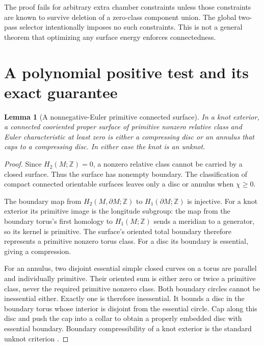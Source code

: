 \documentclass[11pt,letterpaper]{article}
\newtheorem{lemma}[theorem]{Lemma}
\theoremstyle{definition}
\newcommand{\Z}{\mathbb Z}
\begin{document}
The proof fails for arbitrary extra chamber constraints unless those constraints are known to survive deletion of a zero-class component union. The global two-pass selector intentionally imposes no such constraints. This is not a general theorem that optimizing any surface energy enforces connectedness.

\section{A polynomial positive test and its exact guarantee}\label{sec:positive}

\begin{lemma}[A nonnegative-Euler primitive connected surface]\label{lem:annulus}
In a knot exterior, a connected cooriented proper surface of primitive nonzero relative class and Euler characteristic at least zero is either a compressing disc or an annulus that caps to a compressing disc. In either case the knot is an unknot.
\end{lemma}
\begin{proof}
Since $H_2(M;\Z)=0$, a nonzero relative class cannot be carried by a closed surface. Thus the surface has nonempty boundary. The classification of compact connected orientable surfaces leaves only a disc or annulus when $\chi\geq0$.

The boundary map from $H_2(M,\partial M;\Z)$ to $H_1(\partial M;\Z)$ is injective. For a knot exterior its primitive image is the longitude subgroup: the map from the boundary torus's first homology to $H_1(M;\Z)$ sends a meridian to a generator, so its kernel is primitive. The surface's oriented total boundary therefore represents a primitive nonzero torus class. For a disc its boundary is essential, giving a compression.

For an annulus, two disjoint essential simple closed curves on a torus are parallel and individually primitive. Their oriented sum is either zero or twice a primitive class, never the required primitive nonzero class. Both boundary circles cannot be inessential either. Exactly one is therefore inessential. It bounds a disc in the boundary torus whose interior is disjoint from the essential circle. Cap along this disc and push the cap into a collar to obtain a properly embedded disc with essential boundary. Boundary compressibility of a knot exterior is the standard unknot criterion \cite{lackenby}.
\end{proof}
\end{document}
